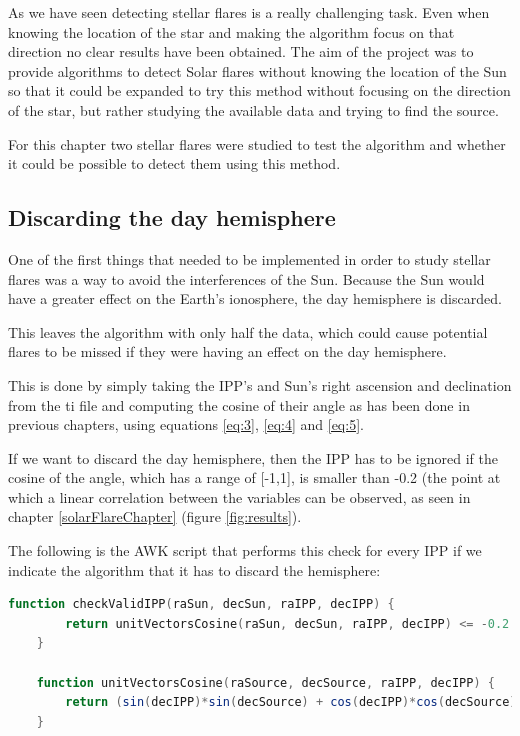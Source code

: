 As we have seen detecting stellar flares is a really challenging task. Even when knowing the location of the star and making the algorithm focus on that direction no clear results have been obtained. The aim of the project was to provide algorithms to detect Solar flares without knowing the location of the Sun so that it could be expanded to try this method without focusing on the direction of the star, but rather studying the available data and trying to find the source.

For this chapter two stellar flares were studied to test the algorithm and whether it could be possible to detect them using this method.

\subsection{Discarding the day hemisphere}

One of the first things that needed to be implemented in order to study stellar flares was a way to avoid the interferences of the Sun. Because the Sun would have a greater effect on the Earth's ionosphere, the day hemisphere is discarded.

This leaves the algorithm with only half the data, which could cause potential flares to be missed if they were having an effect on the day hemisphere.

This is done by simply taking the IPP's and Sun's right ascension and declination from the ti file and computing the cosine of their angle as has been done in previous chapters, using equations \ref{eq:3}, \ref{eq:4} and \ref{eq:5}.

If we want to discard the day hemisphere, then the IPP has to be ignored if the cosine of the angle, which has a range of [-1,1], is smaller than -0.2 (the point at which a linear correlation between the variables can be observed, as seen in chapter \ref{solarFlareChapter} (figure \ref{fig:results}).

The following is the AWK script that performs this check for every IPP if we indicate the algorithm that it has to discard the hemisphere:

\begin{minipage}{\linewidth}
	\begin{lstlisting}[language=awk, caption=Discarding the day hemisphere]
	function checkValidIPP(raSun, decSun, raIPP, decIPP) {
		return unitVectorsCosine(raSun, decSun, raIPP, decIPP) <= -0.2
	}
	
	function unitVectorsCosine(raSource, decSource, raIPP, decIPP) {
		return (sin(decIPP)*sin(decSource) + cos(decIPP)*cos(decSource)*cos(raIPP - raSource));
	}
\end{lstlisting}
\end{minipage}

